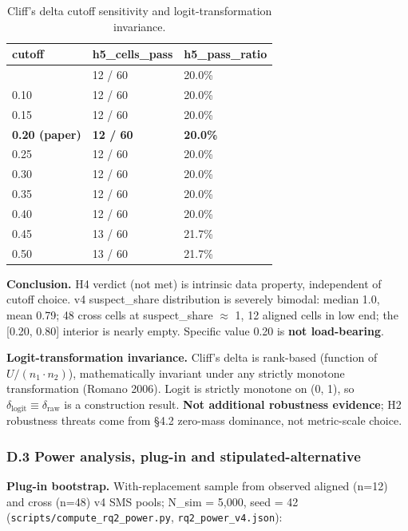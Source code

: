 \documentclass[review,12pt,authoryear]{elsarticle}
\begin{document}
{\def\LTcaptype{table} %
\begin{longtable}[]{@{}lll@{}}
\caption{Cliff's delta cutoff sensitivity and logit-transformation invariance.}\label{tab:p2-22}\\
\toprule\noalign{}
cutoff & h5\_cells\_pass & h5\_pass\_ratio \\
\midrule\noalign{}
\endfirsthead
\endhead
\bottomrule\noalign{}
\endlastfoot
0.05 & 12 / 60 & 20.0\% \\
0.10 & 12 / 60 & 20.0\% \\
0.15 & 12 / 60 & 20.0\% \\
\textbf{0.20 (paper)} & \textbf{12 / 60} & \textbf{20.0\%} \\
0.25 & 12 / 60 & 20.0\% \\
0.30 & 12 / 60 & 20.0\% \\
0.35 & 12 / 60 & 20.0\% \\
0.40 & 12 / 60 & 20.0\% \\
0.45 & 13 / 60 & 21.7\% \\
0.50 & 13 / 60 & 21.7\% \\
\end{longtable}
}

\textbf{Conclusion.} H4 verdict (not met) is intrinsic data property,
independent of cutoff choice. v4 suspect\_share distribution is severely
bimodal: median 1.0, mean 0.79; 48 cross cells at suspect\_share $\approx$ 1, 12
aligned cells in low end; the {[}0.20, 0.80{]} interior is nearly empty.
Specific value 0.20 is \textbf{not load-bearing}.

\textbf{Logit-transformation invariance.} Cliff's delta is rank-based
(function of $U / (n_1 \cdot n_2)$), mathematically invariant under any strictly
monotone transformation (Romano 2006). Logit is strictly monotone on (0,
1), so $\delta_{\mathrm{logit}} \equiv \delta_{\mathrm{raw}}$ is a construction result. \textbf{Not
additional robustness evidence}; H2 robustness threats come from §4.2
zero-mass dominance, not metric-scale choice.

\subsubsection{D.3 Power analysis, plug-in and stipulated-alternative}\label{d.3-power-analysis-plug-in-and-stipulated-alternative}

\textbf{Plug-in bootstrap.} With-replacement sample from observed
aligned (n=12) and cross (n=48) v4 SMS pools; N\_sim = 5,000, seed = 42
(\texttt{scripts/compute\_rq2\_power.py}, \texttt{rq2\_power\_v4.json}):
\end{document}
